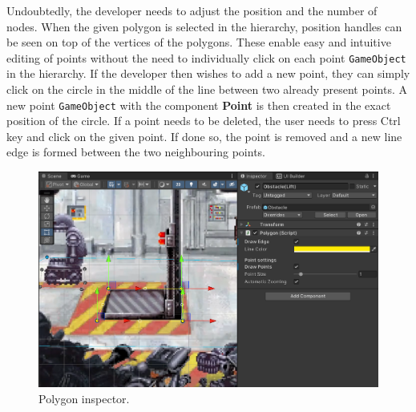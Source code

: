 Undoubtedly, the developer needs to adjust the position and the number of nodes. When the given polygon is selected in the hierarchy, position handles can be seen on top of the vertices of the polygons. These enable easy and intuitive editing of points without the need to individually click on each point \verb|GameObject| in the hierarchy. If the developer then wishes to add a new point, they can simply click on the circle in the middle of the line between two already present points. A new point \verb|GameObject| with the component \textbf{Point} is then created in the exact position of the circle. If a point needs to be deleted, the user needs to press Ctrl key and click on the given point. If done so, the point is removed and a new line edge is formed between the two neighbouring points.
\begin{figure}[H]
\centering
\includegraphics[width=1\linewidth]{img/User doc/polygon.png}
\caption{Polygon inspector.}
\label{fig:Manual-Polygon}
\end{figure}

